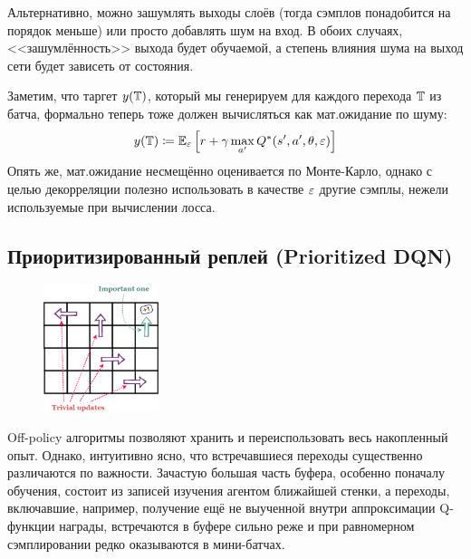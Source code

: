 \begin{remark}
Альтернативно, можно зашумлять выходы слоёв (тогда сэмплов понадобится на порядок меньше) или просто добавлять шум на вход. В обоих случаях, <<зашумлённость>> выхода будет обучаемой, а степень влияния шума на выход сети будет зависеть от состояния.
\end{remark}

Заметим, что таргет $y(\mathbb{T})$, который мы генерируем для каждого перехода $\mathbb{T}$ из батча, формально теперь тоже должен вычисляться как мат.ожидание по шуму:
$$y(\mathbb{T}) \coloneqq \mathbb{E}_\varepsilon \left[ r + \gamma \max_{a'} Q^*(s', a', \theta, \varepsilon) \right]$$
Опять же, мат.ожидание несмещённо оценивается по Монте-Карло, однако с целью декорреляции полезно использовать в качестве $\varepsilon$ другие сэмплы, нежели используемые при вычислении лосса.

\subsection{Приоритизированный реплей (Prioritized DQN)}\label{subsec:prioritizedreplay}


\begin{figure}
\vspace{-0.3cm}
\centering
\includegraphics[width=0.3\textwidth]{Images/PER.png}
\vspace{-0.3cm}
\end{figure}

Off-policy алгоритмы позволяют хранить и переиспользовать весь накопленный опыт. Однако, интуитивно ясно, что встречавшиеся переходы существенно различаются по важности. Зачастую большая часть буфера, особенно поначалу обучения, состоит из записей изучения агентом ближайшей стенки, а переходы, включавшие, например, получение ещё не выученной внутри аппроксимации Q-функции награды, встречаются в буфере сильно реже и при равномерном сэмплировании редко оказываются в мини-батчах.

